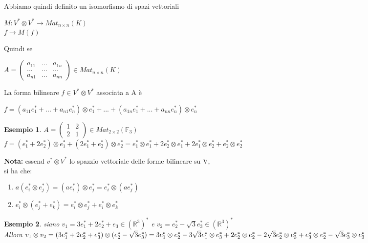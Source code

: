 \documentclass[a4paper,12pt]{article}
\theoremstyle{def}
\theoremstyle{prop}
\theoremstyle{esempio}
\newtheorem*{example}{Esempio}
\theoremstyle{dimostrazione}
\theoremstyle{teo}
\theoremstyle{osservazione}
\begin{document}
Abbiamo quindi definito un isomorfismo di spazi vettoriali
\begin{center}
	\(M: V^* \otimes V^* \rightarrow Mat_{n \times n}(K)\)\\
	\(f \rightarrow M(f)\)
\end{center}
Quindi se
\begin{center}
	\(A = \begin{pmatrix}
		a_{11} & ... & a_{1n} \\
		...    & ... & ...    \\
		a_{n1} & ... & a_{nn}
	\end{pmatrix} \in Mat_{n \times n}(K)\)
\end{center}
La forma bilineare \(f \in V^* \otimes V^*\) associata a A è
\begin{center}
	\(f = (a_{11} e_1^* + ... + a_{n1}e_n^*) \otimes e_1^* + ... + (a_{1n} e_1^* + ... + a_{nn}e_n^*) \otimes e_n^*\)
\end{center}
\begin{example}
	\(A = \begin{pmatrix}
		1 & 2 \\
		2 & 1
	\end{pmatrix} \in Mat_{2 \times 2}(\mathbb{F}_3)\)\\
	\(f = (e_1^* + 2e_2^*) \otimes e_1^* + (2e_1^* + e_2^*) \otimes e_2^* = e_1^* \otimes e_1^* + 2 e_2^* \otimes e_1^* + 2e_1^* \otimes e_2^* + e_2^* \otimes e_2^*\)
\end{example}

\textbf{Nota:} essend \(v^* \otimes V^*\) lo spazzio vettoriale delle forme bilineare su V,\\
si ha che:
\begin{enumerate}
	\item \(a(e_i^* \otimes e_j^*) = (a e_i^*) \otimes e_j^* = e_i^* \otimes (ae_j^*)\)
	\item \(e_i^* \otimes (e_j^* + e_k^*) = e_i^* \otimes e_j^* + e_i^* \otimes e_k^*\)
\end{enumerate}

\begin{example}
	siano \(v_1 = 3e_1^* + 2e_2^* + e_3 \in (\mathbb{R}^3)^*\) e \(v_2 = e_2^* - \sqrt{3} e_3^* \in (\mathbb{R}^3)^*\)\\
	Allora \(v_1 \otimes v_2 = (3e_1^* + 2e_2^* + e_3^*) \otimes (e_2^* - \sqrt{3} e_3^*) =\\
	3e_1^* \otimes e_2^* - 3\sqrt{3} e_1^* \otimes e_3^* + 2e_2^* \otimes e_2^* - 2\sqrt{3} e_2^* \otimes e_3^* + e_3^* \otimes e_2^* - \sqrt{3} e_3^* \otimes e_3^*\)
\end{example}
\end{document}
